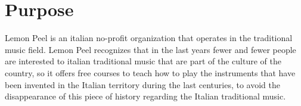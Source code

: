 \documentclass[../../DD.tex]{subfiles}
\begin{document}
\section{Purpose}
Lemon Peel is an italian no-profit organization that operates in the traditional music field. Lemon Peel recognizes that in the last years fewer and fewer people are interested to italian traditional music that are part of the culture of the country, so it offers free courses to teach how to play the instruments that have been invented in the Italian territory during the last centuries, to avoid the disappearance of this piece of history regarding the Italian traditional music. 
\end{document}
